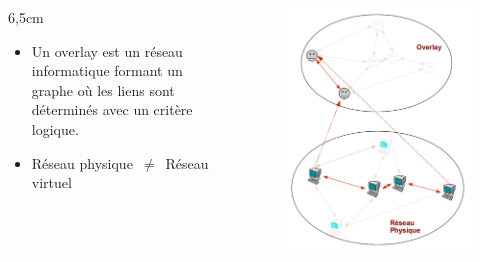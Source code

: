 \documentclass{beamer}
\begin{document}
  \begin{frame}\addtocounter{framenumber}{-1}

        \begin{columns}
          \begin{column}{6,5cm}
                \begin{itemize}
                \item Un overlay est un réseau informatique formant un graphe où les liens sont déterminés avec un critère logique.\\
                \item Réseau physique~$\neq$~Réseau virtuel
                \end{itemize}
          \end{column}
          \begin{column}{5cm}
                \begin{figure}
                  \includegraphics[scale=0.1]{./Ressources/Images/overlay1.png}\\
                  \label{Propa_Algo}
                \end{figure}
          \end{column}
        \end{columns}

  \end{frame}
\end{document}
